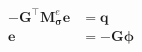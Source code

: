 \begin{equation}
    \begin{split}
        - \mathbf{G}^\top \mathbf{M}_{\boldsymbol{\sigma}}^e \mathbf{e} &= \mathbf{q} \\
        \mathbf{e} &= -\mathbf{G}\boldsymbol{\phi}
    \end{split}
    \label{eq:DiscreteDCNodal}
\end{equation}
